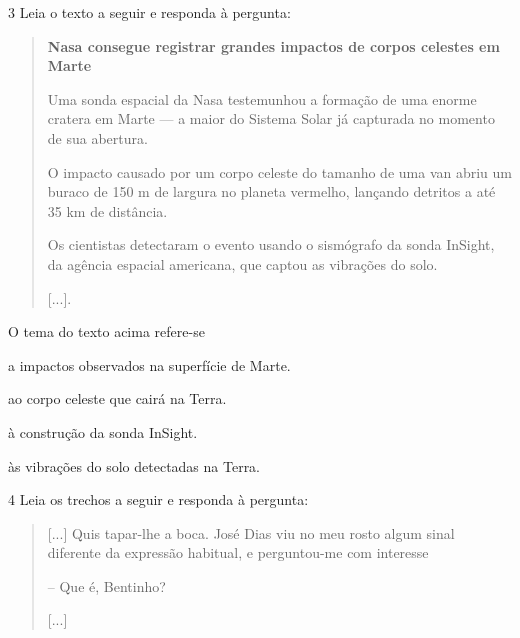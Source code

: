 \num{3} Leia o texto a seguir e responda à pergunta:

\begin{quote}
\textbf{Nasa consegue registrar grandes impactos de corpos celestes em Marte}

Uma sonda espacial da Nasa testemunhou a formação de uma enorme
cratera em Marte --- a maior do Sistema Solar já capturada no momento de
sua abertura.

O impacto causado por um corpo celeste do tamanho de uma van abriu um
buraco de 150 m de largura no planeta vermelho, lançando detritos a até
35 km de distância.

Os cientistas detectaram o evento usando o sismógrafo da sonda InSight,
da agência espacial americana, que captou as vibrações do solo.

{[}...{]}.

\end{quote}

O tema do texto acima refere-se

\begin{escolha}
\item a impactos observados na superfície de Marte.

\item ao corpo celeste que cairá na Terra.

\item à construção da sonda InSight.

\item às vibrações do solo detectadas na Terra.
\end{escolha}


\num{4} Leia os trechos a seguir e responda à pergunta:

\begin{quote}
{[}...{]} Quis tapar-lhe a boca. José Dias viu no meu rosto algum
sinal diferente da expressão habitual, e perguntou-me com interesse

-- Que é, Bentinho?

{[}...{]}

\end{quote}

